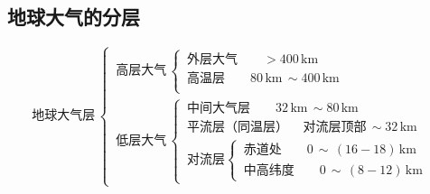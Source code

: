  \subsection{地球大气的分层}
\begin{equation*}
	\mbox{地球大气层}\,
	\begin{cases}
		\, \mbox{高层大气}\,
			\begin{cases}
				\, \mbox{外层大气} \qquad  > 400  \, \text{km}\\[0.5em]
				\, \mbox{高温层} \qquad  80 \, \text{km} \, \sim 400 \, \text{km} \\
			\end{cases}\\[2em]
	\, \mbox{低层大气}\,
			\begin{cases}
				\, \mbox{中间大气层} \qquad 32 \, \text{km} \, \sim 80 \, \text{km}\\[0.5em]
				\, \mbox{平流层（同温层）}\quad \, \text{对流层顶部} \, \sim 32 \, \text{km}\\[0.5em]
				\, \mbox{对流层}
					\begin{cases}
						\, \mbox{赤道处}\qquad 0 \, \sim \, (16 - 18)\, \text{km}\\
						\, \mbox{中高纬度} \qquad 0 \, \sim \, (8 - 12)\, \text{km}
					\end{cases}
			\end{cases}
	\end{cases}
\end{equation*}

